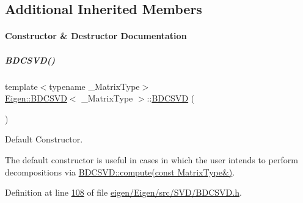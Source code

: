 \subsection*{Additional Inherited Members}


\paragraph{Constructor \& Destructor Documentation}
\mbox{\label{group___s_v_d___module_a39514816d38f9c418cf3f3514b511c2c}} 
\subparagraph{\texorpdfstring{B\+D\+C\+S\+V\+D()}{BDCSVD()}\hspace{0.1cm}{\footnotesize\ttfamily [1/6]}}
{\footnotesize\ttfamily template$<$typename \+\_\+\+Matrix\+Type$>$ \\
\hyperlink{group___s_v_d___module_class_eigen_1_1_b_d_c_s_v_d}{Eigen\+::\+B\+D\+C\+S\+VD}$<$ \+\_\+\+Matrix\+Type $>$\+::\hyperlink{group___s_v_d___module_class_eigen_1_1_b_d_c_s_v_d}{B\+D\+C\+S\+VD} (\begin{DoxyParamCaption}{ }\end{DoxyParamCaption})\hspace{0.3cm}{\ttfamily [inline]}}



Default Constructor. 

The default constructor is useful in cases in which the user intends to perform decompositions via \hyperlink{group___s_v_d___module_acf27f41ed044d74ea8e8cbaf17ffdb04}{B\+D\+C\+S\+V\+D\+::compute(const Matrix\+Type\&)}. 

Definition at line \hyperlink{eigen_2_eigen_2src_2_s_v_d_2_b_d_c_s_v_d_8h_source_l00108}{108} of file \hyperlink{eigen_2_eigen_2src_2_s_v_d_2_b_d_c_s_v_d_8h_source}{eigen/\+Eigen/src/\+S\+V\+D/\+B\+D\+C\+S\+V\+D.\+h}.

